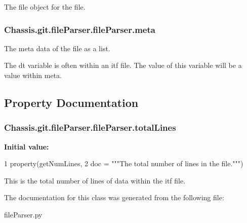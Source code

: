 The file object for the file. 

\hypertarget{class_chassis_8git_1_1file_parser_1_1file_parser_abc3276e824252bca239dd8f225b94724}{
\subsubsection[{meta}]{\setlength{\rightskip}{0pt plus 5cm}Chassis.\-git.\-file\-Parser.\-file\-Parser.\-meta}}\label{class_chassis_8git_1_1file_parser_1_1file_parser_abc3276e824252bca239dd8f225b94724}


The meta data of the file as a list. 

The dt variable is often within an itf file. The value of this variable will be a value within meta. 

\subsection{Property Documentation}
\hypertarget{class_chassis_8git_1_1file_parser_1_1file_parser_af91767a86e07d0ee859c2548d88c7bc7}{
\subsubsection[{total\-Lines}]{\setlength{\rightskip}{0pt plus 5cm}Chassis.\-git.\-file\-Parser.\-file\-Parser.\-total\-Lines\hspace{0.3cm}{\ttfamily [static]}}}\label{class_chassis_8git_1_1file_parser_1_1file_parser_af91767a86e07d0ee859c2548d88c7bc7}
{\bfseries Initial value\-:}
\begin{DoxyCode}
1 property(getNumLines,
2                doc = \textcolor{stringliteral}{"""The total number of lines in the file."""})
\end{DoxyCode}


This is the total number of lines of data within the itf file. 



The documentation for this class was generated from the following file\-:\begin{DoxyCompactItemize}
\item 
file\-Parser.\-py\end{DoxyCompactItemize}
